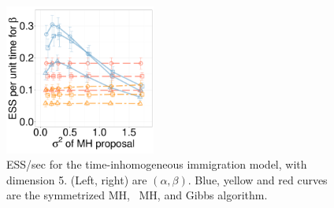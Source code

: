 \begin{figure}[H]
\begin{minipage}[!hp]{0.65\linewidth}
    \includegraphics [width=0.44\textwidth, angle=0]{figs/new_whole_exp_figs/cq_beta_dim10.pdf}
  \end{minipage}
  \begin{minipage}[!hp]{0.33\linewidth}
    \caption{ESS/sec for the time-inhomogeneous immigration model, with 
      dimension 5. (Left, right) are $(\alpha, \beta)$. Blue, yellow and red curves are the symmetrized MH,
  \naive\ MH, and Gibbs algorithm.}
     \label{fig:ESS_pc_1010}
  \end{minipage}

  \end{figure}
